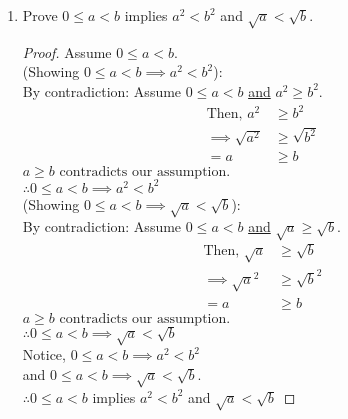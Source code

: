 \documentclass[a4paper]{article}
\begin{document}
\begin{flushleft}
\begin{enumerate}
            \item
            Prove $0\leq a < b$ implies $a^2<b^2$ and $\sqrt{a}<\sqrt{b}$.
            \begin{proof}
                Assume $0\leq a < b$. \\
                (Showing $0\leq a < b \implies a^2 < b^2$):\\
                By contradiction:  Assume $0\leq a < b$ \underline{and} $a^2\geq b^2$.
                \begin{align*}
                    \text{Then, } a^2 &\geq b^2  \\
                    \implies \sqrt{a^2} &\geq \sqrt{b^2} \\
                    = a &\geq b 
                \end{align*}
                $a \geq b \text{ contradicts our assumption.}$ \\
                $\therefore 0\leq a < b \implies a^2 < b^2$ \\
                (Showing $0\leq a < b \implies \sqrt{a} < \sqrt{b}$): \\
                By contradiction:  Assume $0\leq a < b$ \underline{and} $\sqrt{a} \geq \sqrt{b}$.
                \begin{align*}
                    \text{Then, } \sqrt{a} &\geq \sqrt{b}  \\
                    \implies \sqrt{a}^2 &\geq \sqrt{b}^2 \\
                    = a &\geq b 
                \end{align*}
                $a \geq b \text{ contradicts our assumption.}$ \\
                $\therefore 0\leq a < b \implies \sqrt{a} < \sqrt{b}$ \\
                
                Notice, $0\leq a < b \implies a^2 < b^2$ \\
                and $0\leq a < b \implies \sqrt{a} < \sqrt{b}$. \\
                $\therefore 0\leq a < b$ implies $a^2<b^2$ and $\sqrt{a}<\sqrt{b}$
            \end{proof}
        \end{enumerate}
    \end{flushleft}
\end{document}
